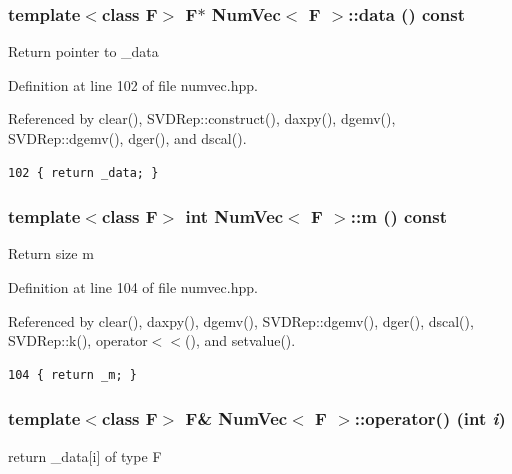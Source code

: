 \subsubsection{\setlength{\rightskip}{0pt plus 5cm}template$<$class F$>$ F$\ast$ {\bf Num\-Vec}$<$ F $>$::data () const\hspace{0.3cm}{\tt  [inline]}}\label{classNumVec_ad3b2b9598c8547b4f7afe7a79ed520c_ad3b2b9598c8547b4f7afe7a79ed520c}


Return pointer to \_\-data 

Definition at line 102 of file numvec.hpp.

Referenced by clear(), SVDRep::construct(), daxpy(), dgemv(), SVDRep::dgemv(), dger(), and dscal().

\footnotesize\begin{verbatim}102 { return _data; }
\end{verbatim}\normalsize 


\subsubsection{\setlength{\rightskip}{0pt plus 5cm}template$<$class F$>$ int {\bf Num\-Vec}$<$ F $>$::m () const\hspace{0.3cm}{\tt  [inline]}}\label{classNumVec_6a2fa69c25bf8ed36e019d0fb3f5e966_6a2fa69c25bf8ed36e019d0fb3f5e966}


Return size m 

Definition at line 104 of file numvec.hpp.

Referenced by clear(), daxpy(), dgemv(), SVDRep::dgemv(), dger(), dscal(), SVDRep::k(), operator$<$$<$(), and setvalue().

\footnotesize\begin{verbatim}104 { return _m; }
\end{verbatim}\normalsize 


\subsubsection{\setlength{\rightskip}{0pt plus 5cm}template$<$class F$>$ F\& {\bf Num\-Vec}$<$ F $>$::operator() (int {\em i})\hspace{0.3cm}{\tt  [inline]}}\label{classNumVec_a6859783df5149b240b538ed4f692366_a6859783df5149b240b538ed4f692366}


return \_\-data[i] of type F 

